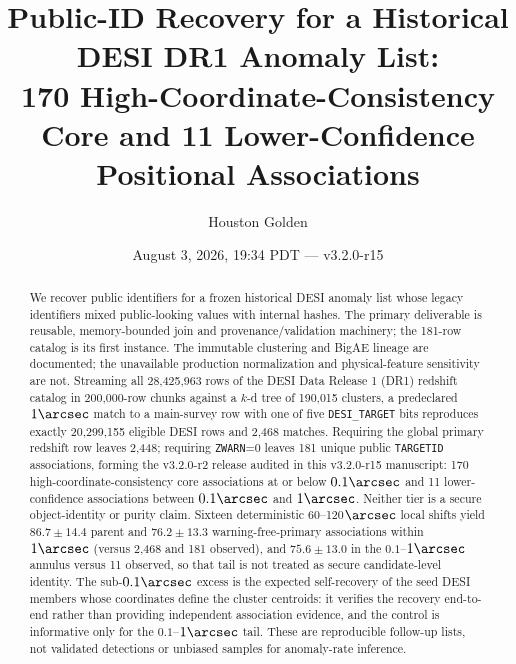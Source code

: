 \documentclass[twocolumn,linenumbers]{aastex702}
\newcommand{\paperVersion}{v3.2.0-r15}
\newcommand{\paperTimestamp}{August 3, 2026, 19:34 PDT}
\newcommand{\releaseVersion}{v3.2.0-r2}
\begin{document}
\title{Public-ID Recovery for a Historical DESI DR1 Anomaly List:\\
170 High-Coordinate-Consistency Core and 11 Lower-Confidence Positional Associations}

\author{Houston Golden}
\date{\paperTimestamp{} --- \paperVersion}

\begin{abstract}
We recover public identifiers for a frozen historical DESI anomaly list whose legacy
identifiers mixed public-looking values with internal hashes.  The primary deliverable is
reusable, memory-bounded join and provenance/validation machinery; the 181-row catalog is its
first instance.  The immutable clustering and BigAE lineage are documented; the unavailable
production normalization and physical-feature sensitivity are not.  Streaming all 28,425,963
rows of the DESI Data Release 1 (DR1) redshift catalog in 200,000-row chunks against a $k$-d
tree of 190,015 clusters, a predeclared $1\arcsec$ match to a main-survey row with one of five
\texttt{DESI\_TARGET} bits reproduces exactly 20,299,155 eligible DESI rows and 2,468 matches.
Requiring the global primary redshift row leaves 2,448; requiring \texttt{ZWARN}=0 leaves 181
unique public \texttt{TARGETID} associations, forming the \releaseVersion{} release audited in
this \paperVersion{} manuscript: 170 high-coordinate-consistency core associations at or below
$0.1\arcsec$ and 11 lower-confidence associations between $0.1\arcsec$ and $1\arcsec$.  Neither
tier is a secure object-identity or purity claim.  Sixteen deterministic 60--120$\arcsec$ local
shifts yield $86.7\pm14.4$ parent and $76.2\pm13.3$ warning-free-primary associations within
$1\arcsec$ (versus 2,468 and 181 observed), and $75.6\pm13.0$ in the $0.1$--$1\arcsec$ annulus
versus 11 observed, so that tail is not treated as secure candidate-level identity.  The
sub-$0.1\arcsec$ excess is the expected self-recovery of the seed DESI members whose coordinates
define the cluster centroids: it verifies the recovery end-to-end rather than providing
independent association evidence, and the control is informative only for the
$0.1$--$1\arcsec$ tail.  These are reproducible follow-up lists, not validated detections or
unbiased samples for anomaly-rate inference.
\end{abstract}
\end{document}
